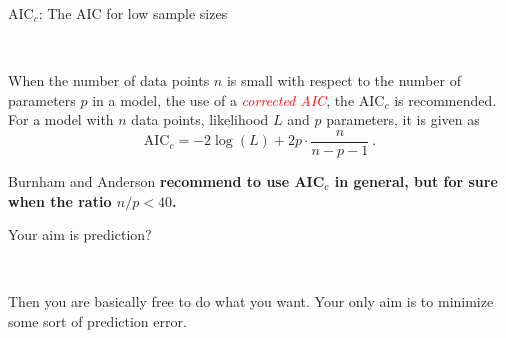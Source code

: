 \documentclass[10pt,ignorenonframetext,]{beamer}
\begin{document}
\begin{frame}

\begin{block}{AIC\(_c\): The AIC for low sample sizes}

\(~\)

When the number of data points \(n\) is small with respect to the number
of parameters \(p\) in a model, the use of a
\emph{\textcolor{red}{corrected AIC}}, the AIC\(_c\) is recommended. For
a model with \(n\) data points, likelihood \(L\) and \(p\) parameters,
it is given as \begin{equation*}
\text{AIC}_c = -2\log(L) + 2p\cdot\frac{n}{n-p-1} \ .
\end{equation*}

\vspace{2mm}

Burnham and Anderson \textbf{recommend to use AIC\(_c\) in general, but
for sure when the ratio \(n/p<40\).}

\end{block}

\end{frame}

\begin{frame}

\begin{block}{Your aim is prediction?}

\(~\)

Then you are basically free to do what you want. Your only aim is to
minimize some sort of prediction error.

\end{block}

\end{frame}
\end{document}

